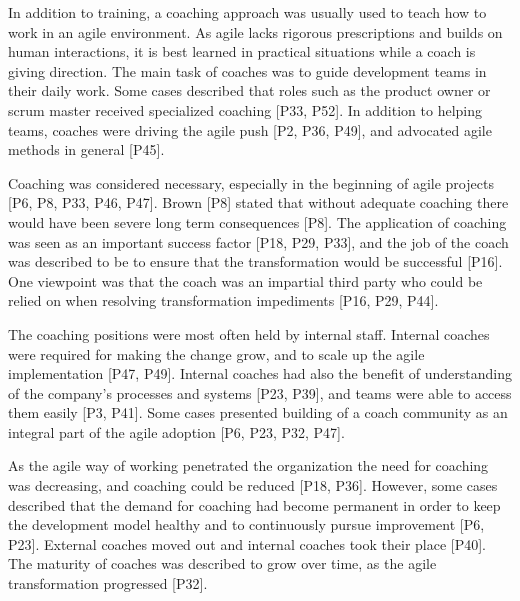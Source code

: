 
In addition to training, a coaching approach was usually used to teach how to
work in an agile environment. As agile lacks rigorous prescriptions and builds
on human interactions, it is best learned in practical situations while a coach
is giving direction.
The main task of coaches was to guide development teams in their daily work.
Some cases described that roles such as the product owner or scrum master
received specialized coaching [P33, P52].
In addition to helping teams, coaches were driving the agile push [P2, P36,
P49], and advocated agile methods in general [P45].

Coaching was considered necessary, especially in the beginning of agile projects
[P6, P8, P33, P46, P47]. Brown [P8] stated that without adequate coaching there
would have been severe long term consequences [P8]. The application of coaching
was seen as an important success factor [P18, P29, P33], and the job of the
coach was described to be to ensure that the transformation would be successful
[P16]. One viewpoint was that the coach was an impartial third party who could
be relied on when resolving transformation impediments [P16, P29, P44].


The coaching positions were most often held by internal staff.
Internal coaches were required for making the change grow, and to scale up the
agile implementation [P47, P49]. Internal coaches had also the benefit of
understanding of the company's processes and systems [P23, P39], and teams were
able to access them easily [P3, P41]. Some cases presented building of a coach
community as an integral part of the agile adoption [P6, P23, P32, P47].

As the agile way of working penetrated the organization the need for coaching
was decreasing, and coaching could be reduced [P18, P36]. However, some cases
described that the demand for coaching had become permanent in order to keep the
development model healthy and to continuously pursue improvement [P6, P23].
External coaches moved out and internal coaches took their place [P40].
The maturity of coaches was described to grow over time, as the agile
transformation progressed [P32].




